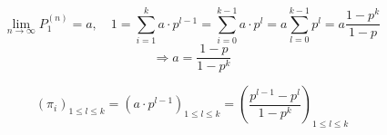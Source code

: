 \begin{flushenum}
%

  \item
   \[ \lim_{n\rightarrow\infty} P_{1}^{(n)} = a, \quad
      1 = \sum_{i=1}^{k} a \cdot p^{l-1} = \sum_{i=0}^{k-1} a \cdot p^{l} = a
   \sum_{l=0}^{k-1} p^{l} = a \frac{1-p^{k}}{1-p} \]
  \[ \Rightarrow a = \frac{1-p}{1-p^{k}} \]

  \[ (\pi_{i})_{1\leq l\leq k} = (a\cdot p^{l-1})_{1\leq l\leq k} 
     = (\frac{p^{l-1} - p^{l}}{1-p^{k}})_{1\leq l\leq k} \]
\end{flushenum}
